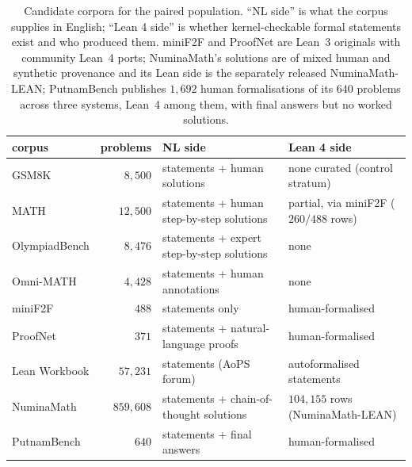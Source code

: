 \begin{table}[h]
\centering
\footnotesize
\caption{Candidate corpora for the paired population. ``NL side'' is what the
corpus supplies in English; ``Lean 4 side'' is whether kernel-checkable formal
statements exist and who produced them. miniF2F and ProofNet are Lean~3
originals with community Lean~4 ports; NuminaMath's solutions are of mixed human
and synthetic provenance and its Lean side is the separately released
NuminaMath-LEAN; PutnamBench publishes $1{,}692$ human formalisations of its
$640$ problems across three systems, Lean~4 among them, with final answers but
no worked solutions.}
\label{tab:roster}
\setlength{\tabcolsep}{4pt}%
\begin{tabular}{@{}p{} r p{} p{}@{}}
\toprule
corpus & problems & NL side & Lean 4 side \\
\midrule
GSM8K \citep{cobbe2021gsm8k} & $8{,}500$ &
  statements + human solutions & none curated (control stratum) \\
MATH \citep{hendrycks2021math} & $12{,}500$ &
  statements + human step-by-step solutions &
  partial, via miniF2F ($260/488$ rows) \\
OlympiadBench \citep{he2024olympiadbench} & $8{,}476$ &
  statements + expert step-by-step solutions & none \\
Omni-MATH \citep{gao2024omnimath} & $4{,}428$ &
  statements + human annotations & none \\
miniF2F \citep{zheng2022minif2f} & $488$ &
  statements only & human-formalised \\
ProofNet \citep{azerbayev2023proofnet} & $371$ &
  statements + natural-language proofs & human-formalised \\
Lean Workbook \citep{ying2024lean} & $57{,}231$ &
  statements (AoPS forum) & autoformalised statements \\
NuminaMath \citep{li2024numinamath} & $859{,}608$ &
  statements + chain-of-thought solutions &
  $104{,}155$ rows (NuminaMath-LEAN) \\
PutnamBench \citep{tsoukalas2024putnambench} & $640$ &
  statements + final answers & human-formalised \\
\bottomrule
\end{tabular}
\end{table}

